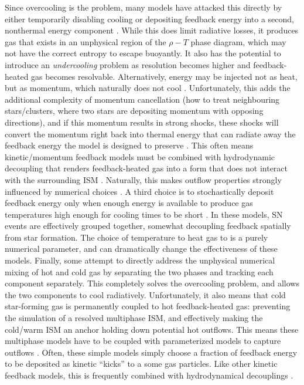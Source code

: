 Since overcooling is the problem, many models have attacked this directly by
either temporarily disabling cooling \citep{Thacker2000,Stinson2006} or
depositing feedback energy into a second, nonthermal energy component
\citep{Agertz2013}.  While this does limit radiative losses, it produces gas
that exists in an unphysical region of the $\rho-T$ phase diagram, which may not
have the correct entropy to escape buoyantly.  It also has the potential to
introduce an \textit{undercooling} problem as resolution becomes higher and
feedback-heated gas becomes resolvable.  Alternatively, energy may be injected
not as heat, but as momentum, which naturally does not cool
\citep{Navarro1993,Mihos1994,Scannapieco2006,DallaVecchia2008,Dubois2008}.
Unfortunately, this adds the additional complexity of momentum cancellation (how
to treat neighbouring stars/clusters, where two stars are depositing momentum
with opposing directions), and if this momentum results in strong shocks, these
shocks will convert the momentum right back into thermal energy that can radiate
away the feedback energy the model is designed to preserve \citep{Durier2012}.
This often means kinetic/momentum feedback models must be combined with
hydrodynamic decoupling that renders feedback-heated gas into a form that does
not interact with the surrounding ISM \citep{Springel2003,Vogelsberger2013}.
Naturally, this makes outflow properties strongly influenced by numerical
choices \citep{DallaVecchia2008}.  A third choice is to stochastically deposit
feedback energy only when enough energy is available to produce gas temperatures
high enough for cooling times to be short \citep{DallaVecchia2012,Crain2015}.
In these models, SN events are effectively grouped together, somewhat decoupling
feedback spatially from star formation.  The choice of temperature to heat gas
to is a purely numerical parameter, and can dramatically change the
effectiveness of these models.  Finally, some \citep{Springel2003,Murante2015}
attempt to directly address the unphysical numerical mixing of hot and cold gas
by separating the two phases and tracking each component separately.  This
completely solves the overcooling problem, and allows the two components to cool
radiatively.   Unfortunately, it also means that cold star-forming gas is
permanently coupled to hot feedback-heated gas: preventing the simulation of  a
resolved multiphase ISM, and effectively making the cold/warm ISM an anchor
holding down potential hot outflows.  This means these multiphase models have to
be coupled with parameterized models to capture outflows \citep{Springel2003}.
Often, these simple models simply choose a fraction of feedback energy to be
deposited as kinetic ``kicks'' to a some gas particles.  Like other kinetic
feedback models, this is frequently combined with hydrodynamical decouplings
\citep{Vogelsberger2013}.

